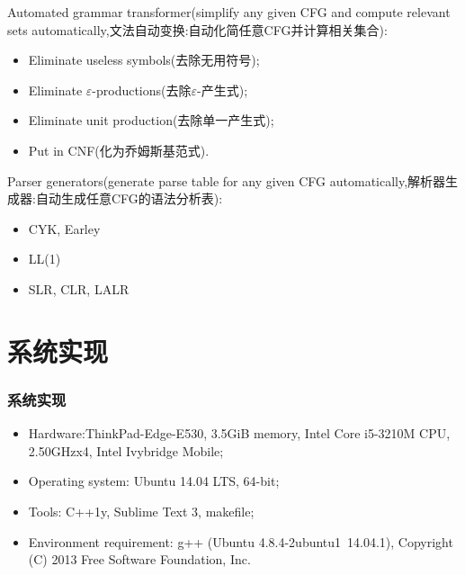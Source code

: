 \documentclass{beamer}
\begin{document}
 \begin{frame}
      Automated grammar transformer(simplify any given CFG and compute relevant sets automatically,文法自动变换:自动化简任意CFG并计算相关集合): 
      \begin{itemize}
      \item Eliminate useless symbols(去除无用符号); 
      \item Eliminate $\varepsilon$-productions(去除$\varepsilon$-产生式); 
     \item Eliminate unit production(去除单一产生式); 
      \item Put in CNF(化为乔姆斯基范式). 
      \end{itemize}
     
     Parser generators(generate parse table for any given CFG automatically,解析器生成器:自动生成任意CFG的语法分析表): 
     \begin{itemize}
\item CYK, Earley 
\item LL(1) 
\item SLR, CLR, LALR
    \end{itemize}
  
 \end{frame}

\section{系统实现}
 \begin{frame}
 \frametitle{系统实现}
 \begin{itemize}
 \item Hardware:ThinkPad-Edge-E530, 3.5GiB memory, Intel Core i5-3210M CPU, 2.50GHzx4, Intel Ivybridge Mobile;
 \item Operating system: Ubuntu 14.04 LTS, 64-bit;
 \item Tools: C++1y, Sublime Text 3, makefile;
 \item Environment requirement: g++ (Ubuntu 4.8.4-2ubuntu1~14.04.1), Copyright (C) 2013 Free Software Foundation, Inc.
 \end{itemize}
 \end{frame}
\end{document}
